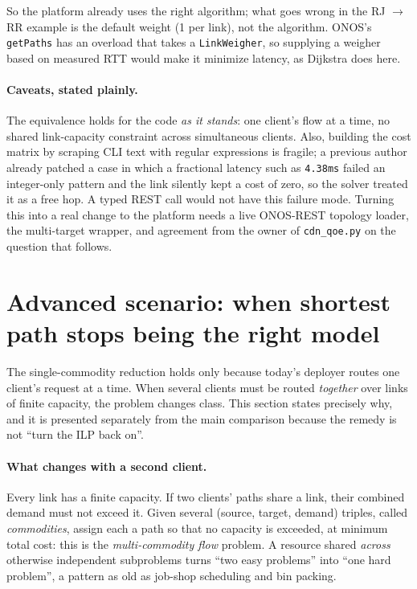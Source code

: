 \documentclass[11pt,a4paper]{article}
\begin{document}
So the platform already uses the right algorithm; what goes wrong in the RJ $\to$ RR example is the default weight
(1 per link), not the algorithm. ONOS's \texttt{getPaths} has an overload that takes a \texttt{LinkWeigher}, so supplying a
weigher based on measured RTT would make it minimize latency, as Dijkstra does here.

\paragraph{Caveats, stated plainly.}
The equivalence holds for the code \emph{as it stands}: one client's flow at a time, no shared link-capacity constraint across
simultaneous clients. Also, building the cost matrix by scraping CLI text with regular expressions is fragile; a previous
author already patched a case in which a fractional latency such as \texttt{4.38ms} failed an integer-only pattern and the link
silently kept a cost of zero, so the solver treated it as a free hop. A typed REST call would not have this failure mode.
Turning this into a real change to the platform needs a live ONOS-REST topology loader, the multi-target wrapper, and
agreement from the owner of \texttt{cdn\_qoe.py} on the question that follows.

\section{Advanced scenario: when shortest path stops being the right model}
\label{sec:nphard}

The single-commodity reduction holds only because today's deployer routes one client's request at a time. When several clients
must be routed \emph{together} over links of finite capacity, the problem changes class. This section states precisely why, and
it is presented separately from the main comparison because the remedy is not ``turn the ILP back on''.

\paragraph{What changes with a second client.}
Every link has a finite capacity. If two clients' paths share a link, their combined demand must not exceed it. Given several
(source, target, demand) triples, called \emph{commodities}, assign each a path so that no capacity is exceeded, at minimum total cost:
this is the \emph{multi-commodity flow} problem. A resource shared \emph{across} otherwise independent subproblems turns ``two easy
problems'' into ``one hard problem'', a pattern as old as job-shop scheduling and bin packing.
\end{document}
